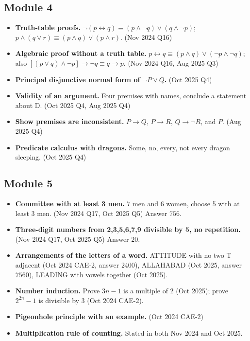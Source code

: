 \documentclass[11pt,a4paper]{article}
\begin{document}
\subsection{Module 4}
\begin{itemize}
\item \textbf{Truth-table proofs.} $\neg(p\leftrightarrow q)\equiv(p\land\neg q)\lor(q\land\neg p)$; $p\land(q\lor r)\equiv(p\land q)\lor(p\land r)$. (Nov 2024 Q16)
\item \textbf{Algebraic proof without a truth table.} $p\leftrightarrow q\equiv(p\land q)\lor(\neg p\land\neg q)$; also $[(p\lor q)\land\neg p]\to\neg q \equiv q\to p$. (Nov 2024 Q16, Aug 2025 Q3)
\item \textbf{Principal disjunctive normal form of $\neg P\lor Q$.} (Oct 2025 Q4)
\item \textbf{Validity of an argument.} Four premises with names, conclude a statement about D. (Oct 2025 Q4, Aug 2025 Q4)
\item \textbf{Show premises are inconsistent.} $P\to Q$, $P\to R$, $Q\to\neg R$, and $P$. (Aug 2025 Q4)
\item \textbf{Predicate calculus with dragons.} Some, no, every, not every dragon sleeping. (Oct 2025 Q4)
\end{itemize}

\subsection{Module 5}
\begin{itemize}
\item \textbf{Committee with at least 3 men.} 7 men and 6 women, choose 5 with at least 3 men. (Nov 2024 Q17, Oct 2025 Q5) Answer $756$.
\item \textbf{Three-digit numbers from 2,3,5,6,7,9 divisible by 5, no repetition.} (Nov 2024 Q17, Oct 2025 Q5) Answer $20$.
\item \textbf{Arrangements of the letters of a word.} ATTITUDE with no two T adjacent (Oct 2024 CAE-2, answer $2400$), ALLAHABAD (Oct 2025, answer $7560$), LEADING with vowels together (Oct 2025).
\item \textbf{Number induction.} Prove $3n-1$ is a multiple of 2 (Oct 2025); prove $2^{2n}-1$ is divisible by 3 (Oct 2024 CAE-2).
\item \textbf{Pigeonhole principle with an example.} (Oct 2024 CAE-2)
\item \textbf{Multiplication rule of counting.} Stated in both Nov 2024 and Oct 2025.
\end{itemize}
\end{document}
